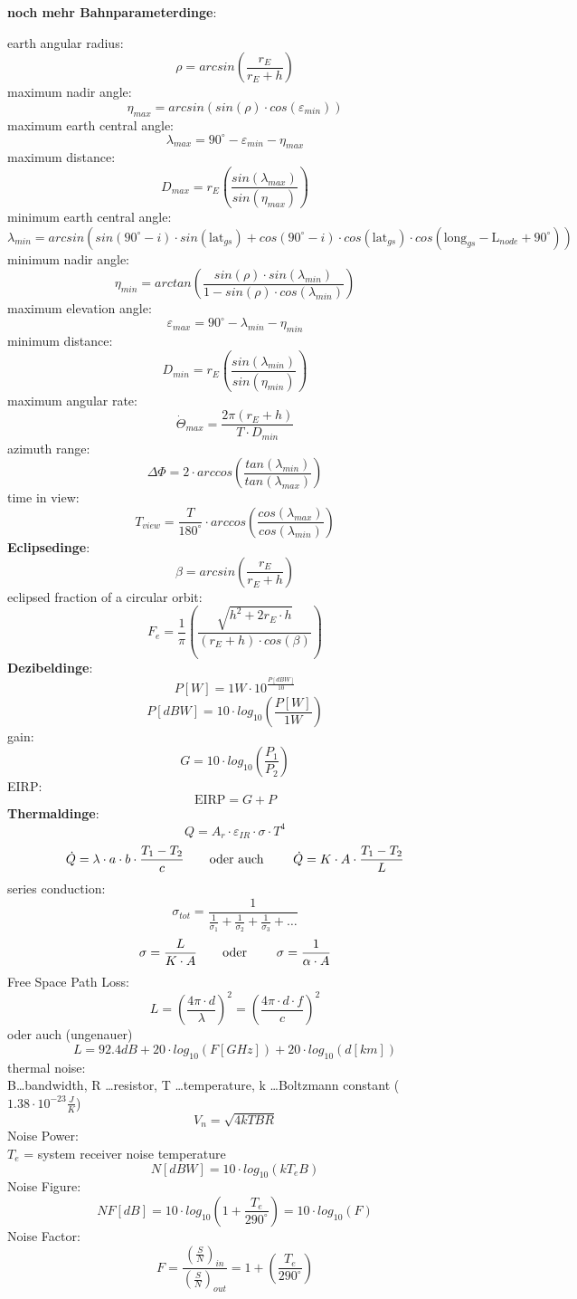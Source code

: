 \documentclass[a4paper,10pt]{article}
\newcommand{\f}{\textbf}
\begin{document}
\noindent \f{noch mehr Bahnparameterdinge}:
\vspace*{5pt}

\noindent earth angular radius:
\[\rho = arcsin\left(\frac{r_E}{r_E + h}\right)\]
maximum nadir angle:
\[\eta_{max} = arcsin(sin(\rho)\cdot cos(\varepsilon_{min})) \]
maximum earth central angle:
\[\lambda_{max} = 90^{\circ} - \varepsilon_{min} - \eta_{max}\]
maximum distance:
\[D_{max} = r_E\left(\frac{sin(\lambda_{max})}{sin(\eta_{max})} \right)\]
minimum earth central angle:
\[\lambda_{min} = arcsin(sin(90^{\circ}-i)\cdot sin(\text{lat}_{gs}) + cos(90^{\circ}-i)\cdot cos(\text{lat}_{gs})\cdot cos(\text{long}_{gs}-\text{L}_{node}+90^{\circ}))\]
minimum nadir angle:
\[\eta_{min} = arctan\left(\frac{sin(\rho)\cdot sin(\lambda_{min})}{1-sin(\rho)\cdot cos(\lambda_{min})}\right)\]
maximum elevation angle:
\[\varepsilon_{max} = 90^{\circ} -\lambda_{min} - \eta_{min}\]
minimum distance:
\[D_{min} = r_E\left(\frac{sin(\lambda_{min})}{sin(\eta_{min})}\right)\]
maximum angular rate:
\[\dot{\Theta}_{max} = \frac{2\pi(r_E + h)}{T\cdot D_{min}}\]
azimuth range:
\[\Delta \Phi = 2\cdot arccos\left(\frac{tan(\lambda_{min})}{tan(\lambda_{max})}\right)\]
time in view:
\[T_{view} = \frac{T}{180^{\circ}}\cdot arccos\left(\frac{cos(\lambda_{max})}{cos(\lambda_{min})}\right)\]
\f{Eclipsedinge}:
\[\beta = arcsin\left(\frac{r_E}{r_E+h}\right)\]
eclipsed fraction of a circular orbit:
\[F_e = \frac{1}{\pi}\left(\frac{\sqrt{h^2 +2r_E\cdot h}}{(r_E + h)\cdot cos(\beta)} \right)\]
\f{Dezibeldinge}:
\[P[W] = 1W\cdot 10^{\frac{P[dBW]}{10}}\]
\[P[dBW] = 10\cdot log_{10}\left(\frac{P[W]}{1W}\right)\]
gain:
\[G = 10\cdot log_{10}\left(\frac{P_1}{P_2}\right)\]
EIRP: 
\[\text{EIRP} = G + P\]
\f{Thermaldinge}:
\[Q = A_r\cdot \varepsilon_{IR}\cdot \sigma \cdot T^4\]
\[\dot{Q} = \lambda\cdot a\cdot b \cdot \frac{T_1-T_2}{c} \text{\qquad oder auch \qquad} \dot{Q} = K \cdot A \cdot \frac{T_1-T_2}{L}\]
series conduction:
\[\sigma_{tot} = \frac{1}{\frac{1}{\sigma_1} + \frac{1}{\sigma_2} + \frac{1}{\sigma_3} + \dots}\]
\[\sigma = \frac{L}{K\cdot A} \text{\qquad oder \qquad} \sigma = \frac{1}{\alpha\cdot A}\]
Free Space Path Loss:
\[L = \left(\frac{4\pi\cdot d}{\lambda}\right)^2 = \left(\frac{4\pi\cdot d\cdot f}{c}\right)^2\] 
oder auch (ungenauer)
\[L = 92.4dB + 20\cdot log_{10}(F[GHz]) + 20\cdot log_{10}(d[km])\]
thermal noise:\\
B\dots bandwidth, R \dots resistor, T \dots temperature, k \dots Boltzmann constant ($1.38\cdot 10^{-23}\frac{J}{K}$)
\[V_n = \sqrt{4kTBR}\]
Noise Power:\\
$T_e$ = system receiver noise temperature
\[N[dBW] = 10\cdot log_{10}(kT_eB)\]
Noise Figure:\\
\[NF[dB] = 10\cdot log_{10}\left(1 + \frac{T_e}{290^{\circ}}\right) = 10\cdot log_{10}(F)\]
Noise Factor:
\[F = \frac{\left(\frac{S}{N}\right)_{in}}{\left(\frac{S}{N}\right)_{out}} = 1 + \left(\frac{T_e}{290^{\circ}}\right)\]
\vspace*{5pt}
\end{document}
